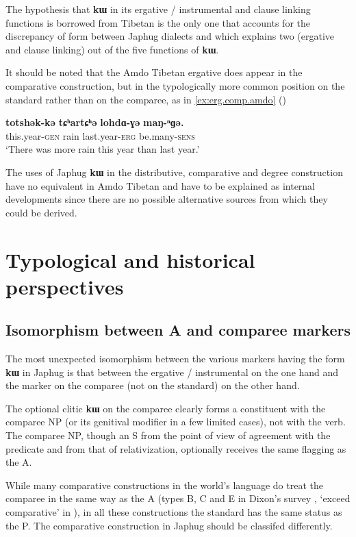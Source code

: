 \documentclass[oldfontcommands,oneside,a4paper,11pt]{article}
\newcommand{\ipa}[1]{{\phon\textbf{#1}}}
\begin{document}
The hypothesis that \ipa{kɯ} in its ergative / instrumental and clause linking functions is borrowed from Tibetan is the only one that accounts for the discrepancy of form between Japhug  dialects and which explains two (ergative and clause linking) out of the five functions of \ipa{kɯ}.

It should be noted that the Amdo Tibetan  ergative does appear in the comparative construction, but in the typologically more common position on the standard rather than on the comparee, as in \ref{ex:erg.comp.amdo}  (\citealt[239]{vbrugmo03maqu})

 \begin{exe} 
\ex \label{ex:erg.comp.amdo}
\gll 
\ipa{totshək-kə}  	\ipa{tɕʰartɕʰə}  	\ipa{lohdɑ-ɣə}  	\ipa{maŋ-ⁿɡə.}  \\
this.year-\textsc{gen} rain last.year-\textsc{erg} be.many-\textsc{sens} \\
 \glt   `There was more rain this year than last year.'
\end{exe}  

The uses of Japhug \ipa{kɯ} in the distributive, comparative and degree construction have no equivalent in Amdo Tibetan and have to be explained as internal developments since there are no  possible alternative sources from which they could be derived.

\section{Typological and historical perspectives} \label{sec:historical}

\subsection{Isomorphism between A and comparee markers}
The most unexpected isomorphism between the various markers having the form \ipa{kɯ} in Japhug is that between the ergative / instrumental on the one hand and the marker on the comparee (not on the standard) on the other hand.   

The optional clitic \ipa{kɯ} on the comparee  clearly forms a constituent with the comparee NP (or its genitival modifier in a few limited cases), not with the verb. The comparee NP, though an S from the point of view of agreement with the predicate and from that of relativization, optionally receives  the same flagging as the A.

 
While many comparative constructions in the world's language do treat the comparee in the same way as the A (types B, C and E in Dixon's survey \citeyearpar[789]{dixon08comparative}, `exceed comparative' in  \citealt{stassen11comparative}), in all these constructions the standard has the same status as the P.  The comparative construction in Japhug should be classifed differently. 
\end{document}
